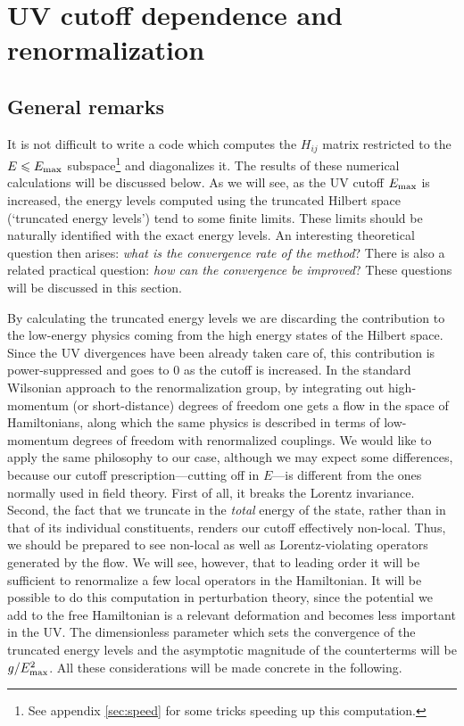 \documentclass[11pt]{article}
\def\le{\leqslant}
\def \Emax{E_{\rm max}}
\numberwithin{equation}{section}
\begin{document}
\section{UV cutoff dependence and renormalization}
\label{sec:renormalization}

\subsection{General remarks}

It is not difficult to write a code which computes the $H_{ij}$ matrix restricted to the $E\le \Emax$ subspace\footnote{See appendix \ref{sec:speed} for some tricks speeding up this computation.} and diagonalizes it.
The results of these numerical calculations will be discussed below. As we will see, as the UV cutoff $\Emax$ is increased, the energy levels computed using the truncated Hilbert space (`truncated energy levels') tend to some finite limits. These limits should be naturally identified with the exact energy levels. An interesting theoretical question then arises: \emph{what is the convergence rate of the method}? There is also a related practical question: \emph{how can the convergence be improved}? These questions will be discussed in this section.

By calculating the truncated energy levels we are discarding the contribution to the low-energy physics coming from the high energy states of the Hilbert space. Since the UV divergences have been already taken care of, this contribution is power-suppressed and goes to $0$ as the cutoff is increased.
In the standard Wilsonian approach to the renormalization group, by integrating out high-momentum (or short-distance) degrees of freedom one gets a flow in the space of Hamiltonians, along which the same physics is described in terms of low-momentum degrees of freedom with renormalized couplings. We would like to apply the same philosophy to our case, although we may expect some differences, because our cutoff prescription---cutting off in $E$---is different from the ones normally used in field theory. First of all, it breaks the Lorentz invariance. Second, the fact that we truncate in the \emph{total} energy of the state, rather than in that of its individual constituents, renders our cutoff effectively non-local. Thus, we should be prepared to see non-local as well as Lorentz-violating operators generated by the flow. We will see, however, that to leading order it will be sufficient to renormalize a few local operators in the Hamiltonian. It will be possible to do this computation in perturbation theory, since the potential we add to the free Hamiltonian is a relevant deformation and becomes less important in the UV. The dimensionless parameter which sets the convergence of the truncated energy levels  and the asymptotic magnitude of the counterterms will be ${g}/{\Emax^2}$. All these considerations will be made concrete in the following.
\end{document}

